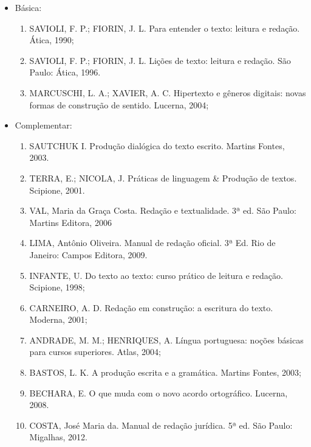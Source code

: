\begin{itemize} 
    \item Básica:
	\begin{enumerate}
		\item SAVIOLI, F. P.; FIORIN, J. L.  Para entender o texto: leitura e redação. Ática, 1990;  
		\item SAVIOLI, F. P.; FIORIN, J. L. Lições de texto: leitura e redação. São Paulo: Ática, 1996. 
		\item MARCUSCHI, L. A.; XAVIER, A. C. Hipertexto e gêneros digitais: novas formas de construção de sentido. Lucerna, 2004;
	\end{enumerate}
  \item Complementar:
	\begin{enumerate} 
		\item SAUTCHUK I. Produção dialógica do texto escrito. Martins Fontes, 2003.
		\item TERRA, E.; NICOLA, J. Práticas de linguagem \& Produção de textos. Scipione, 2001.
		\item VAL, Maria da Graça Costa. Redação e textualidade. 3ª ed. São Paulo: Martins Editora, 2006
		\item LIMA, Antônio Oliveira. Manual de redação oficial. 3ª Ed. Rio de Janeiro: Campos Editora, 2009.
		\item INFANTE, U. Do texto ao texto: curso prático de leitura e redação. Scipione, 1998; 
		\item CARNEIRO, A. D. Redação em construção: a escritura do texto. Moderna, 2001;
		\item ANDRADE, M. M.; HENRIQUES, A. Língua portuguesa: noções básicas para cursos superiores. Atlas, 2004;
		\item BASTOS, L. K. A produção escrita e a gramática. Martins Fontes, 2003;
		\item BECHARA, E. O que muda com o novo acordo ortográfico. Lucerna, 2008.
		\item COSTA, José Maria da. Manual de redação jurídica. 5ª ed. São Paulo: Migalhas, 2012.
	\end{enumerate}
\end{itemize}

